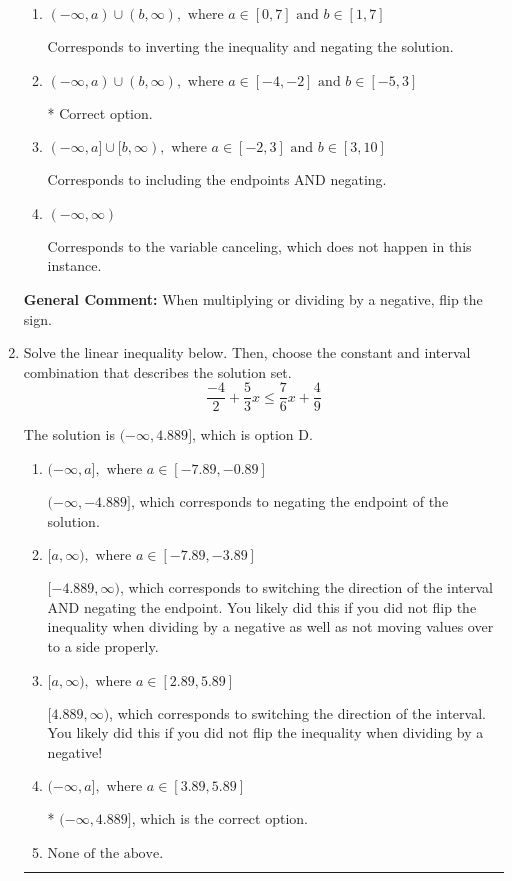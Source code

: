 \documentclass{extbook}[14pt]
\newcommand{\litem}[1]{\item #1

\rule{\textwidth}{0.4pt}}
\begin{document}
\begin{enumerate}
{\begin{enumerate}[label=\Alph*.]
Corresponds to including the endpoints (when they should be excluded).
\item \( (-\infty, a) \cup (b, \infty), \text{ where } a \in [0, 7] \text{ and } b \in [1, 7] \)

Corresponds to inverting the inequality and negating the solution.
\item \( (-\infty, a) \cup (b, \infty), \text{ where } a \in [-4, -2] \text{ and } b \in [-5, 3] \)

 * Correct option.
\item \( (-\infty, a] \cup [b, \infty), \text{ where } a \in [-2, 3] \text{ and } b \in [3, 10] \)

Corresponds to including the endpoints AND negating.
\item \( (-\infty, \infty) \)

Corresponds to the variable canceling, which does not happen in this instance.
\end{enumerate}

\textbf{General Comment:} When multiplying or dividing by a negative, flip the sign.
}
\litem{
Solve the linear inequality below. Then, choose the constant and interval combination that describes the solution set.
\[ \frac{-4}{2} + \frac{5}{3} x \leq \frac{7}{6} x + \frac{4}{9} \]

The solution is \( (-\infty, 4.889] \), which is option D.\begin{enumerate}[label=\Alph*.]
\item \( (-\infty, a], \text{ where } a \in [-7.89, -0.89] \)

 $(-\infty, -4.889]$, which corresponds to negating the endpoint of the solution.
\item \( [a, \infty), \text{ where } a \in [-7.89, -3.89] \)

 $[-4.889, \infty)$, which corresponds to switching the direction of the interval AND negating the endpoint. You likely did this if you did not flip the inequality when dividing by a negative as well as not moving values over to a side properly.
\item \( [a, \infty), \text{ where } a \in [2.89, 5.89] \)

 $[4.889, \infty)$, which corresponds to switching the direction of the interval. You likely did this if you did not flip the inequality when dividing by a negative!
\item \( (-\infty, a], \text{ where } a \in [3.89, 5.89] \)

* $(-\infty, 4.889]$, which is the correct option.
\item \( \text{None of the above}. \)


\end{enumerate}}
\end{enumerate}
\end{document}
